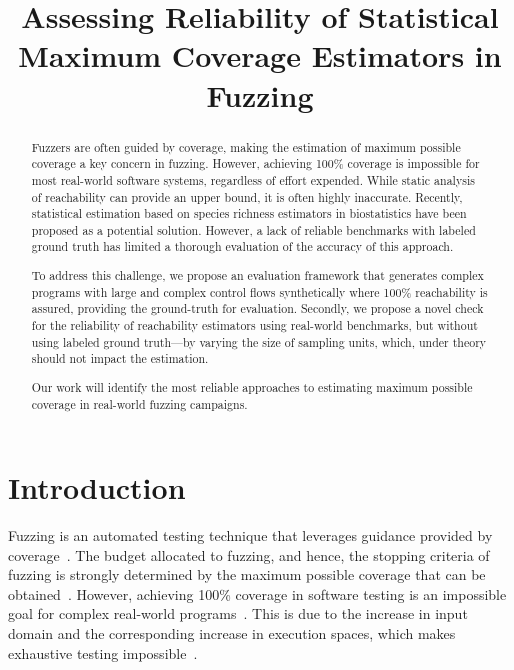 \documentclass[conference]{IEEEtran}
\newcommand{\mytitle}{Assessing Reliability of Statistical Maximum Coverage Estimators in Fuzzing}
\begin{document}
\title{\mytitle}

\author{
\and 
{}
}

\maketitle

\thispagestyle{plain}
\pagestyle{plain} 


\begin{abstract}
Fuzzers are often guided by coverage, making the estimation of maximum
possible coverage a key concern in fuzzing.
However, achieving 100\% coverage is impossible for most real-world
software systems, regardless of effort expended.
While static analysis of reachability can provide an upper bound,
it is often highly inaccurate.
Recently, statistical estimation based on species richness estimators
in biostatistics have been proposed as a potential solution.
However, a lack of reliable benchmarks with labeled ground truth has
limited a thorough evaluation of the accuracy of this approach.

To address this challenge, we propose an evaluation framework
that generates complex programs with large and complex control flows
synthetically where 100\% reachability is assured, providing the
ground-truth for evaluation.
Secondly, we propose a novel check for the reliability of reachability
estimators using real-world benchmarks, but without using labeled ground
truth---by varying the size of sampling units, which, under theory
should not impact the estimation.

Our work will identify the most reliable approaches to estimating maximum
possible coverage in real-world fuzzing campaigns.
\end{abstract}


\section{Introduction}
Fuzzing is an automated testing technique that leverages guidance provided
by coverage~\cite{boehme2016coverage}.
The budget allocated to fuzzing, and hence, the stopping criteria
of fuzzing is strongly determined by the maximum possible coverage that can
be obtained~\cite{fell2017review}.
%
However, achieving 100\% coverage in software testing is an impossible goal for
complex real-world programs~\cite{horgan1994achieving}.
This is due to the increase in input domain and the corresponding
increase in execution spaces, which makes exhaustive testing
impossible~\cite{knight1996exhaustive}.
\end{document}
